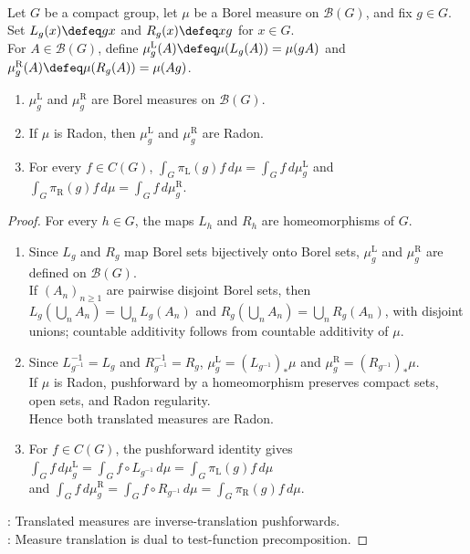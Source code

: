 \begin{proposition} \label{prop:translated-borel-measures-on-compact-groups} \\
Let $G$ be a compact group, let $\mu$ be a Borel measure on $\mathcal{B}(G)$, and fix $g\in G$.\\
Set $L_g(x)\defeq gx$ and $R_g(x)\defeq xg$ for $x\in G$.\\
For $A\in\mathcal{B}(G)$, define $\mu_g^{\mathrm{L}}(A)\defeq\mu(L_g(A))=\mu(gA)$ and $\mu_g^{\mathrm{R}}(A)\defeq\mu(R_g(A))=\mu(Ag)$.
\begin{enumerate}[label=(\roman*)]
\setlength{\itemsep}{0pt}
\item $\mu_g^{\mathrm{L}}$ and $\mu_g^{\mathrm{R}}$ are Borel measures on $\mathcal{B}(G)$.
\item If $\mu$ is Radon, then $\mu_g^{\mathrm{L}}$ and $\mu_g^{\mathrm{R}}$ are Radon.
\item For every $f\in C(G)$, $\int_G \pi_{\mathrm{L}}(g)f\,d\mu=\int_G f\,d\mu_g^{\mathrm{L}}$ and $\int_G \pi_{\mathrm{R}}(g)f\,d\mu=\int_G f\,d\mu_g^{\mathrm{R}}$.
\end{enumerate}
\begin{proof}
For every $h\in G$, the maps $L_h$ and $R_h$ are homeomorphisms of $G$.
\begin{enumerate}[label=(\roman*)]
\setlength{\itemsep}{0pt}
\item Since $L_g$ and $R_g$ map Borel sets bijectively onto Borel sets, $\mu_g^{\mathrm{L}}$ and $\mu_g^{\mathrm{R}}$ are defined on $\mathcal{B}(G)$.\\
If $(A_n)_{n\geq1}$ are pairwise disjoint Borel sets, then $L_g(\bigcup_n A_n)=\bigcup_n L_g(A_n)$ and $R_g(\bigcup_n A_n)=\bigcup_n R_g(A_n)$, with disjoint unions; countable additivity follows from countable additivity of $\mu$.
\item Since $L_{g^{-1}}^{-1}=L_g$ and $R_{g^{-1}}^{-1}=R_g$, $\mu_g^{\mathrm{L}}=(L_{g^{-1}})_*\mu$ and $\mu_g^{\mathrm{R}}=(R_{g^{-1}})_*\mu$.\\
If $\mu$ is Radon, pushforward by a homeomorphism preserves compact sets, open sets, and Radon regularity.\\
Hence both translated measures are Radon.
\item For $f\in C(G)$, the pushforward identity gives $\int_G f\,d\mu_g^{\mathrm{L}}=\int_G f\circ L_{g^{-1}}\,d\mu=\int_G \pi_{\mathrm{L}}(g)f\,d\mu$\\
and $\int_G f\,d\mu_g^{\mathrm{R}}=\int_G f\circ R_{g^{-1}}\,d\mu=\int_G \pi_{\mathrm{R}}(g)f\,d\mu$.
\end{enumerate}
: Translated measures are inverse-translation pushforwards.\\
: Measure translation is dual to test-function precomposition.
\end{proof}
\end{proposition}

